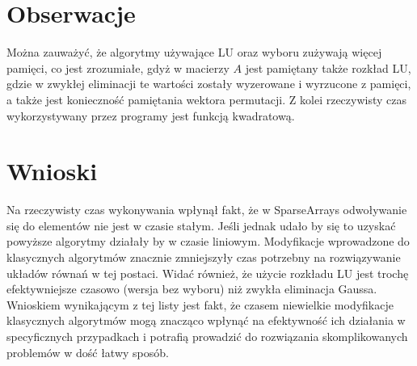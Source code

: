 \documentclass{article}
\begin{document}
\section{Obserwacje}
Można zauważyć, że algorytmy używające LU oraz wyboru zużywają więcej pamięci, 
co jest zrozumiałe, gdyż w macierzy $A$ jest pamiętany także 
rozkład LU, gdzie w zwykłej eliminacji te wartości zostały wyzerowane i 
wyrzucone z pamięci, a także jest konieczność pamiętania wektora permutacji.
Z kolei rzeczywisty czas wykorzystywany przez programy jest 
funkcją kwadratową.

\section{Wnioski}
Na rzeczywisty czas wykonywania wpłynął fakt, że w SparseArrays odwoływanie 
się do elementów nie jest w czasie stałym. Jeśli jednak udało by się to 
uzyskać powyższe algorytmy działały by w czasie liniowym. Modyfikacje 
wprowadzone do klasycznych algorytmów znacznie zmniejszyły czas potrzebny na 
rozwiązywanie układów równań w tej postaci. Widać również, że 
użycie rozkładu LU jest trochę efektywniejsze czasowo (wersja bez wyboru) niż 
zwykła eliminacja Gaussa. 
\newline
\newline
Wnioskiem wynikającym z tej listy jest fakt, że czasem 
niewielkie modyfikacje klasycznych algorytmów mogą znacząco wpłynąć na 
efektywność ich działania w specyficznych przypadkach i potrafią 
prowadzić do rozwiązania skomplikowanych problemów w dość łatwy sposób.
\end{document}
